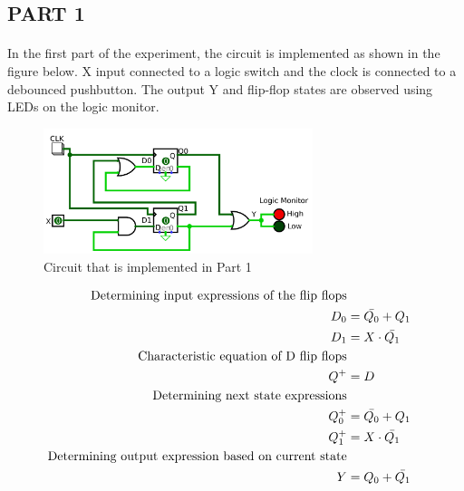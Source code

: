 \documentclass[pdftex,12pt,a4paper]{article}
\begin{document}
\begin{flushleft}
\subsection{PART 1}

\paragraph{}
In the first part of the experiment,  the circuit is implemented as shown in the figure below. X input connected to a logic switch and the clock is connected to a debounced pushbutton.  The output Y and flip-flop states are observed using LEDs on the logic monitor. 

\begin{figure}[h]
	\centering
	\includegraphics[width=0.7\textwidth]{part1.png}	
	\caption{Circuit that is implemented in Part 1}
	\label{circ:part1}
\end{figure}






\begin{align}
    \text{Determining input expressions of the flip flops} \notag \\
     D_{0} &= \bar{Q_{0}} + Q_{1} \notag \\
     D_{1} &= X \cdot \bar{Q_{1}} \notag \\
     \text{Characteristic equation of D flip flops} \notag \\
     Q^{+} &= D \notag \\
     \text{Determining next state expressions} \notag \\
     Q^{+}_{0} &= \bar{Q_{0}} + Q_{1} \notag \\
     Q^{+}_{1} &= X \cdot \bar{Q_{1}} \notag \\
     \text{Determining output expression based on current state} \notag \\
     Y &= Q_{0} + \bar{Q_{1}}  \notag \\
     \notag
\end{align}



\end{flushleft}
\end{document}

